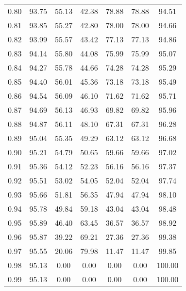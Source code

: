 \begin{tabular}{|c|c|c|c|c|c|c|}
      0.80 &     93.75 &     55.13 &      42.38 &   78.88 &      78.88 &         94.51 \\
      0.81 &     93.85 &     55.27 &      42.80 &   78.00 &      78.00 &         94.66 \\
      0.82 &     93.99 &     55.57 &      43.42 &   77.13 &      77.13 &         94.86 \\
      0.83 &     94.14 &     55.80 &      44.08 &   75.99 &      75.99 &         95.07 \\
      0.84 &     94.27 &     55.78 &      44.66 &   74.28 &      74.28 &         95.29 \\
      0.85 &     94.40 &     56.01 &      45.36 &   73.18 &      73.18 &         95.49 \\
      0.86 &     94.54 &     56.09 &      46.10 &   71.62 &      71.62 &         95.71 \\
      0.87 &     94.69 &     56.13 &      46.93 &   69.82 &      69.82 &         95.96 \\
      0.88 &     94.87 &     56.11 &      48.10 &   67.31 &      67.31 &         96.28 \\
      0.89 &     95.04 &     55.35 &      49.29 &   63.12 &      63.12 &         96.68 \\
      0.90 &     95.21 &     54.79 &      50.65 &   59.66 &      59.66 &         97.02 \\
      0.91 &     95.36 &     54.12 &      52.23 &   56.16 &      56.16 &         97.37 \\
      0.92 &     95.51 &     53.02 &      54.05 &   52.04 &      52.04 &         97.74 \\
      0.93 &     95.66 &     51.81 &      56.35 &   47.94 &      47.94 &         98.10 \\
      0.94 &     95.78 &     49.84 &      59.18 &   43.04 &      43.04 &         98.48 \\
      0.95 &     95.89 &     46.40 &      63.45 &   36.57 &      36.57 &         98.92 \\
      0.96 &     95.87 &     39.22 &      69.21 &   27.36 &      27.36 &         99.38 \\
      0.97 &     95.55 &     20.06 &      79.98 &   11.47 &      11.47 &         99.85 \\
      0.98 &     95.13 &      0.00 &       0.00 &    0.00 &       0.00 &        100.00 \\
      0.99 &     95.13 &      0.00 &       0.00 &    0.00 &       0.00 &        100.00 \\
\bottomrule
\end{tabular}
